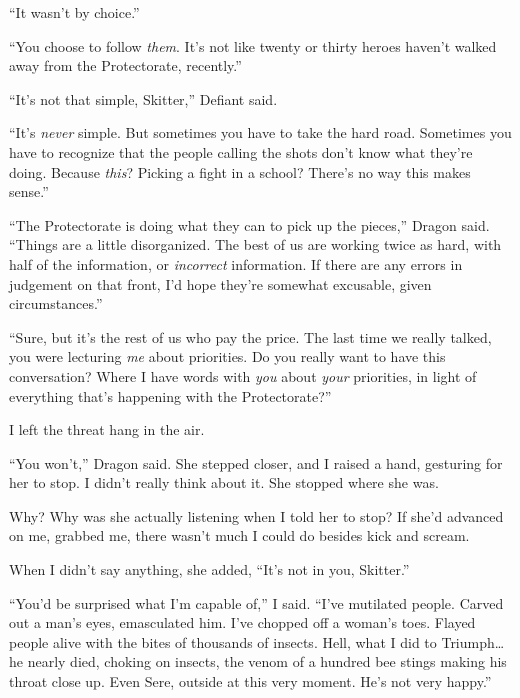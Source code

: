 ``It wasn't by choice.''



``You choose to follow \emph{them}.  It's not like twenty or thirty heroes haven't walked away from the Protectorate, recently.''



``It's not that simple, Skitter,'' Defiant said.



``It's \emph{never} simple.  But sometimes you have to take the hard road.  Sometimes you have to recognize that the people calling the shots don't know what they're doing.  Because \emph{this}?  Picking a fight in a school?  There's no way this makes sense.''



``The Protectorate is doing what they can to pick up the pieces,'' Dragon said.  ``Things are a little disorganized.  The best of us are working twice as hard, with half of the information, or \emph{incorrect} information.  If there are any errors in judgement on that front, I'd hope they're somewhat excusable, given circumstances.''



``Sure, but it's the rest of us who pay the price.  The last time we really talked, you were lecturing \emph{me} about priorities.  Do you really want to have this conversation?  Where I have words with \emph{you} about \emph{your} priorities, in light of everything that's happening with the Protectorate?''



I left the threat hang in the air.



``You won't,'' Dragon said.  She stepped closer, and I raised a hand, gesturing for her to stop.  I didn't really think about it.  She stopped where she was.



Why?  Why was she actually listening when I told her to stop?  If she'd advanced on me, grabbed me, there wasn't much I could do besides kick and scream.



When I didn't say anything, she added, ``It's not in you, Skitter.''



``You'd be surprised what I'm capable of,'' I said.  ``I've mutilated people.  Carved out a man's eyes, emasculated him.  I've chopped off a woman's toes.  Flayed people alive with the bites of thousands of insects.  Hell, what I did to Triumph\ldots he nearly died, choking on insects, the venom of a hundred bee stings making his throat close up.  Even Sere, outside at this very moment.  He's not very happy.''



